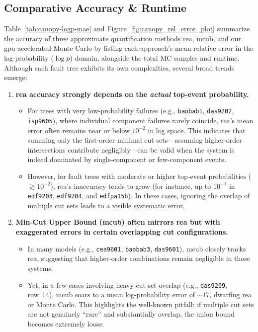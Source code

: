 \subsection{Comparative Accuracy \& Runtime}


Table~\ref{tab:canopy-logp-mae} and Figure~\ref{fig:canopy_rel_error_plot} summarize the accuracy of three approximate quantification methods \acrfull{rea}, \acrfull{mcub}, and our \acrshort{gpu}-accelerated Monte Carlo by listing each approach's mean relative error in the log-probability (\(\log p\)) domain, alongside the total MC samples and runtime. Although each fault tree exhibits its own complexities, several broad trends emerge:

\begin{enumerate}
    \item \textbf{\acrshort{rea} accuracy strongly depends on the \emph{actual} top-event probability.}
    \begin{itemize}
        \item For trees with very low-probability failures (e.g., \texttt{baobab1}, \texttt{das9202}, \texttt{isp9605}), where individual component failures rarely coincide, \acrshort{rea}'s mean error often remains near or below \(10^{-2}\) in log space. This indicates that summing only the first-order minimal cut sets—assuming higher-order intersections contribute negligibly—can be valid when the system is indeed dominated by single-component or few-component events.
        \item However, for fault trees with moderate or higher top-event probabilities (\(\gtrsim 10^{-2}\)), \acrshort{rea}'s inaccuracy tends to grow (for instance, up to \(10^{-1}\) in \texttt{edf9203}, \texttt{edf9204}, and \texttt{edfpa15b}). In these cases, ignoring the overlap of multiple cut sets leads to a visible systematic error.
    \end{itemize}

    \item \textbf{Min-Cut Upper Bound (\acrshort{mcub}) often mirrors \acrshort{rea} but with exaggerated errors in certain overlapping cut configurations.}
    \begin{itemize}
        \item In many models (e.g., \texttt{cea9601}, \texttt{baobab3}, \texttt{das9601}), \acrshort{mcub} closely tracks \acrshort{rea}, suggesting that higher-order combinations remain negligible in those systems.
        \item Yet, in a few cases involving heavy cut-set overlap (e.g., \texttt{das9209}, row~14), \acrshort{mcub} soars to a mean log-probability error of \(\sim 17\), dwarfing \acrshort{rea} or Monte Carlo. This highlights the well-known pitfall: if multiple cut sets are not genuinely ``rare'' and substantially overlap, the union bound becomes extremely loose.
    \end{itemize}


\end{enumerate}
